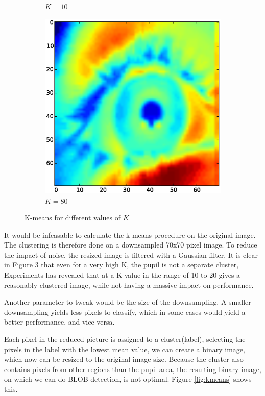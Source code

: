 \documentclass[a4paper,11pt]{article}
\begin{document}
\begin{figure}[H]
\begin{subfigure}{.33\textwidth}
  \caption{$K=10$}
  \label{fig:kmeans_sub2}
\end{subfigure}
\begin{subfigure}{.33\textwidth}
  \centering
  \includegraphics[width=1\linewidth]{kmean_k80_v70}
  \caption{$K=80$}
  \label{fig:kmeans_sub3}
\end{subfigure}
\caption{K-means for different values of $K$}
\label{fig:kmeans_small}
\end{figure}

It would be infeasable to calculate the k-means procedure on the original image. The clustering is therefore done on a downsampled 70x70 pixel image. To reduce the impact of noise, the resized image is filtered with a Gaussian filter. It is clear in Figure \ref{fig:kmeans_small} that even for a very high K, the pupil is not a separate cluster, Experiments has revealed that at a K value in the range of 10 to 20 gives a reasonably clustered image, while not having a massive impact on performance.

Another parameter to tweak would be the size of the downsampling. A smaller downsampling yields less pixels to classify, which in some cases would yield a better performance, and vice versa.

Each pixel in the reduced picture is assigned to a cluster(label), selecting the pixels in the label with the lowest mean value, we can create a binary image, which now can be resized to the original image size. Because the cluster also contains pixels from other regions than the pupil area, the resulting binary image, on which we can do BLOB detection, is not optimal. Figure \ref{fig:kmeans} shows this.
\end{document}
